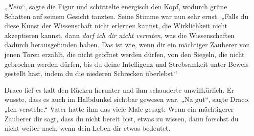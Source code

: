 „\emph{Nein}“, sagte die Figur und schüttelte energisch den Kopf, wodurch grüne Schatten auf seinem Gesicht tanzten. Seine Stimme war nun sehr ernst.
„Falls du diese Kunst der Wissenschaft nicht erlernen kannst, die Wirklichkeit nicht akzeptieren kannst, dann \emph{darf ich dir nicht verraten}, was die Wissenschaften dadurch herausgefunden haben. Das ist wie, wenn dir ein mächtiger Zauberer von jenen Toren erzählt, die nicht geöffnet werden dürfen, von den Siegeln, die nicht gebrochen werden dürfen, bis du deine Intelligenz und Strebsamkeit unter Beweis gestellt hast, indem du die niederen Schrecken überlebst.“

Draco lief es kalt den Rücken herunter und ihm schauderte unwillkürlich. Er wusste, dass es auch im Halbdunkel sichtbar gewesen war.
„Na gut“, sagte Draco.
„Ich verstehe.“ Vater hatte ihm das viele Male gesagt: Wenn ein mächtigerer Zauberer dir sagt, dass du nicht bereit bist, etwas zu wissen, dann forschst du nicht weiter nach, wenn dein Leben dir etwas bedeutet.

